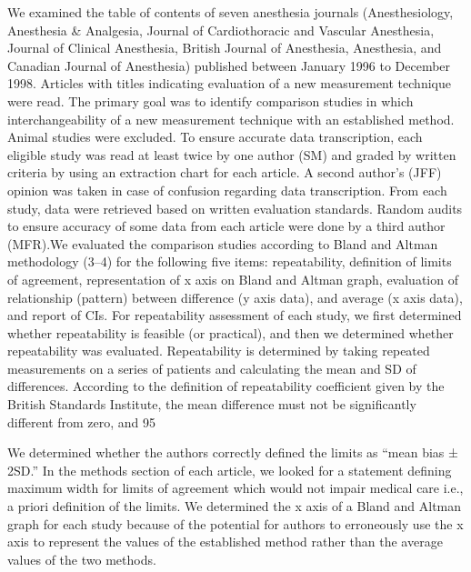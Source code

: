 \documentclass[]{article}
\begin{document}
We examined the table of contents of seven anesthesia journals (Anesthesiology, Anesthesia & Analgesia, Journal of Cardiothoracic and Vascular Anesthesia, Journal of Clinical Anesthesia, British Journal of Anesthesia, Anesthesia, and Canadian Journal of Anesthesia) published between January 1996 to December 1998. Articles with titles indicating evaluation of a new measurement technique were read. The primary goal was to identify comparison studies in which interchangeability of a new measurement technique with an established method. Animal studies were excluded. To ensure accurate data transcription, each eligible study was read at least twice by one author (SM) and graded by written criteria by using an extraction chart for each article. A second author’s (JFF) opinion was taken in case of confusion regarding data transcription. From each study, data were retrieved based on written evaluation standards. Random audits to ensure accuracy of some data from each article were done by a third author (MFR).We evaluated the comparison studies according to Bland and Altman methodology (3–4) for the following five items: repeatability, definition of limits of agreement, representation of x axis on Bland and Altman graph, evaluation of relationship (pattern) between difference (y axis data), and average (x axis data), and report of CIs. For repeatability assessment of each study, we first determined whether repeatability is feasible (or practical), and then we determined whether repeatability was evaluated. Repeatability is determined by taking repeated measurements on a series of patients and calculating the mean and SD of differences. According to the definition of repeatability coefficient given by the British Standards Institute, the mean difference must not be significantly different from zero, and 95%

We determined whether the authors correctly defined the limits as “mean bias ± 2SD.” In the methods section of each article, we looked for a statement defining maximum width for limits of agreement which would not impair medical care i.e., a priori definition of the limits. We determined the x axis of a Bland and Altman graph for each study because of the potential for authors to erroneously use the x axis to represent the values of the established method rather than the average values of the two methods. 
\end{document}
